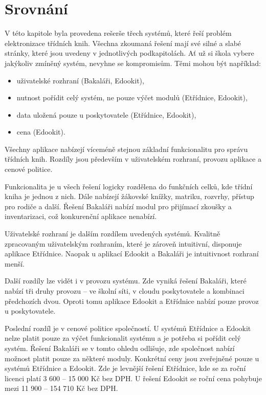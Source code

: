 \section{Srovnání}
V této kapitole byla provedena rešerše třech systémů, které řeší problém elektronizace třídních knih. Všechna zkoumaná řešení mají své silné a slabé stránky, které jsou uvedeny v jednotlivých podkapitolách. Ať už si škola vybere jakýkoliv zmíněný systém, nevyhne se kompromisům. Těmi mohou být například:

\begin{itemize}
    \item uživatelské rozhraní (Bakaláři, Edookit),
    \item nutnost pořídit celý systém, ne pouze výčet modulů (Etřídnice, Edookit),
    \item data uložená pouze u poskytovatele (Etřídnice, Edookit),
    \item cena (Edookit).
\end{itemize}

\noindent Všechny aplikace nabízejí víceméně stejnou základní funkcionalitu pro správu třídních knih. Rozdíly jsou především v uživatelském rozhraní, provozu aplikace a cenové politice.

Funkcionalita je u všech řešení logicky rozdělena do funkčních celků, kde třídní kniha je jednou z nich. Dále nabízejí žákovské knížky, matriku, rozvrhy, přístup pro rodiče a další. Řešení Bakaláři nabízí modul pro přijímací zkoušky a inventarizaci, což konkurenční aplikace nenabízí.

Uživatelské rozhraní je dalším rozdílem uvedených systémů. Kvalitně zpracovaným uživatelským rozhraním, které je zároveň intuitivní, disponuje aplikace Etřídnice. Naopak u aplikací Edookit a Bakaláři je intuitivnost rozhraní menší.

Další rozdíly lze vidět i v provozu systému. Zde vyniká řešení Bakaláři, které nabízí tři druhy provozu -- ve školní síti, v cloudu poskytovatele a kombinaci předchozích dvou. Oproti tomu aplikace Edookit a Etřídnice nabízí pouze provoz u poskytovatele.

Poslední rozdíl je v cenové politice společností. U systémů Etřídnice a Edookit nelze platit pouze za výčet funkcionalit systému a je potřeba si pořídit celý systém. Řešení Bakaláři se v tomto ohledu odlišuje, zde společnost nabízí možnost platit pouze za některé moduly.
Konkrétní ceny jsou zveřejněné pouze u systémů Etřídnice a Edookit. Zde je levnější řešení Etřídnice, kde se za roční licenci platí 3 600 -- 15 000 Kč bez DPH. U řešení Edookit se roční cena pohybuje mezi 11 900 -- 154 710 Kč bez DPH.
